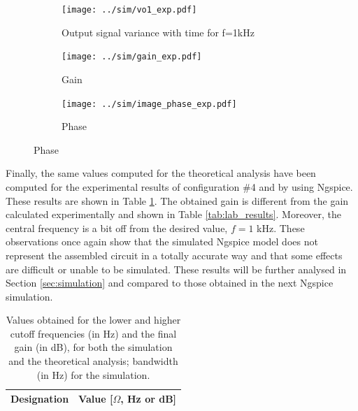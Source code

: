 \begin{figure}[H]
  \begin{subfigure}{.49\linewidth}
    \centering
    \texttt{[image: ../sim/vo1\_exp.pdf]}
    \footnotesize
    \caption{Output signal variance with time for f=1kHz}
    \label{fig:out1_exp}
  \end{subfigure}
  \begin{subfigure}{.49\linewidth}
    \centering
    \texttt{[image: ../sim/gain\_exp.pdf]}
    \caption{Gain}
    \label{fig:out2_exp}
  \end{subfigure}
  \centering
  \begin{subfigure}{.49\linewidth}
    \centering
    \texttt{[image: ../sim/image\_phase\_exp.pdf]}
    \caption{Phase}
    \label{fig:out3_exp}
  \end{subfigure}
\end{figure}

Finally, the same values computed for the theoretical analysis have been computed for the experimental results of configuration $\#$4 and by using Ngspice. These results are shown in Table \ref{tab:rip_exp}. The obtained gain is different from the gain calculated experimentally and shown in Table \ref{tab:lab_results}. Moreover, the central frequency is a bit off from the desired value, $f=1$ kHz. These observations once again show that the simulated Ngspice model does not represent the assembled circuit in a totally accurate way and that some effects are difficult or unable to be simulated. These results will be further analysed in Section \ref{sec:simulation} and compared to those obtained in the next Ngspice simulation.

\begin{table}[H]
  \centering
  \begin{tabular}{|c|c|}
    \hline    
        {\bf Designation} & {\bf Value [$\Omega$, Hz or dB]} \\ \hline
        
        
  \end{tabular}
  \caption{Values obtained for the lower and higher cutoff frequencies (in Hz) and the final gain (in dB), for both the simulation and the theoretical analysis; bandwidth (in Hz) for the simulation.}
  \label{tab:rip_exp}
\end{table}
